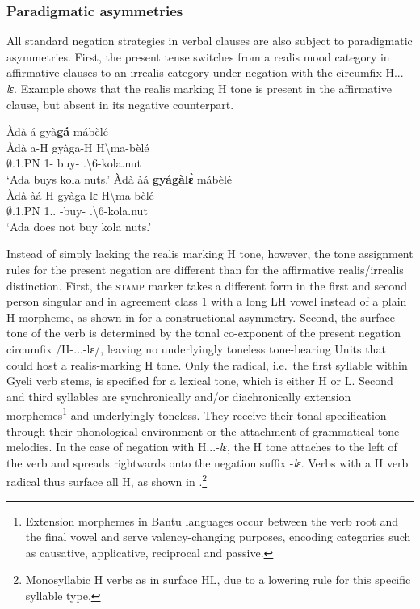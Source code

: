 \documentclass[output=paper,colorlinks=true, citecolor=brown,draftmode]{langscibook}
\begin{document}
\subsubsection{Paradigmatic asymmetries}
\label{sec:gye:PA}

All standard negation strategies in verbal clauses are also subject to paradigmatic asymmetries. First, the present tense switches from a realis mood category in affirmative clauses to an irrealis category under negation with the circumfix H...\nobreakdash-{\itshape lɛ}. Example  shows that the realis marking H tone is present in the affirmative clause, but absent in its negative counterpart. 

\ea\label{leTone}
\ea\label{leTonea} 
  \glll     Àdà á gyà{\bfseries gá} mábèlé \\
          Àdà a-H gyàga-H {H\backslash{}ma-bèlé}\\
          $\emptyset$.1.PN 1-{\PRS} buy-{\R} {{\OBJ}.{\LINK}\backslash{}6-kola.nut}\\
    \trans `Ada buys kola nuts.'
\ex\label{leToneb}
  \glll    Àdà  àá {\bfseries gyágàlɛ̀} mábèlé\\
          Àdà àá H-gyàga-lɛ {H\backslash{}ma-bèlé}\\
      $\emptyset$.1.PN 1.{\PRS}.{\NEG} {\NEG}-buy-{\NEG} {{\OBJ}.{\LINK}\backslash{}6-kola.nut}\\
    \trans `Ada does not buy kola nuts.'
\z 
\z

Instead of simply lacking the realis marking H tone, however, the tone assignment rules for the present negation are different than for the affirmative realis/irrealis distinction. First, the \textsc{stamp} marker takes a different form in the first and second person singular and in agreement class 1 with a long LH vowel instead of a plain H morpheme, as shown in  for a constructional asymmetry. Second, the surface tone of the verb is determined by the tonal co-exponent of the present negation circumfix /H-...-lɛ/, leaving no underlyingly toneless tone-bearing Units that could host a realis-marking H tone.  Only the radical, i.e.\ the first syllable within Gyeli verb stems, is specified for a lexical tone, which is either H or L. Second and third syllables are synchronically and/or diachronically extension morphemes\footnote{Extension morphemes in Bantu languages occur between the verb root and the final vowel and serve valency-changing purposes, encoding categories such as causative, applicative, reciprocal and passive.} and underlyingly toneless. They receive their tonal specification through their phonological environment or the attachment of grammatical tone melodies. In the case of negation with H...-{\itshape lɛ}, the H tone attaches to the left of the verb and spreads rightwards onto the negation suffix -{\itshape lɛ}. Verbs with a H verb radical thus surface all H, as shown in .\footnote{Monosyllabic H verbs as in  surface HL, due to a lowering rule for this specific syllable type.}
\end{document}
